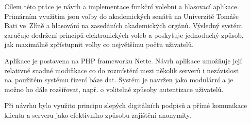 Cílem této práce je návrh a implementace funkční volební a hlasovací aplikace. Primárním využitím jsou volby do akademických senátů na Univerzitě Tomáše Bati ve~Zlíně a hlasování na zasedáních akademických orgánů. Výsledný systém zaručuje dodržení principů elektronických voleb a poskytuje jednoduchý způsob, jak maximálně zpřístupnit volby co největšímu počtu uživatelů.

Aplikace je postavena na PHP frameworku Nette. Návrh aplikace umožňuje její relativně snadné modifikace co do rozmístění mezi několik serverů i nezávislost na~použitém systému řízení báze dat. Systém je navržen jako modulární a je možno ho dále rozšiřovat, např. o volitelné způsoby autentizace uživatelů.

Při návrhu bylo využito principu slepých digitálních podpisů a přímé komunikace klienta a serveru jako efektivního způsobu zajištění anonymity.
